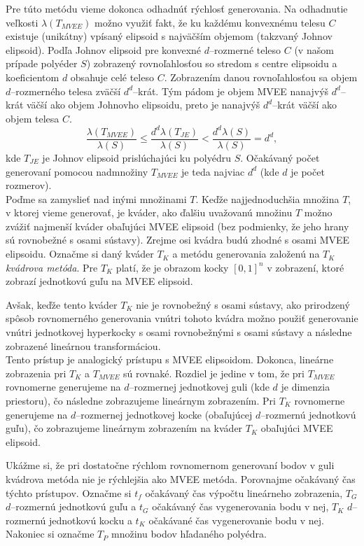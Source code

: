 Pre túto metódu vieme dokonca odhadnúť rýchlosť generovania. Na odhadnutie veľkosti $\lambda(T_{MVEE})$ možno využiť fakt, že ku každému konvexnému telesu $C$ existuje (unikátny) vpísaný elipsoid s najväčším objemom (takzvaný Johnov elipsoid). Podľa \cite{ellipsoids_ball} Johnov elipsoid pre konvexné $d$--rozmerné teleso $C$ (v našom prípade polyéder $S$) zobrazený rovnoľahlosťou so stredom s centre elipsoidu a koeficientom $d$ obsahuje celé teleso $C$. Zobrazením danou rovnoľahlosťou sa objem $d$--rozmerného telesa zväčší $d^d$--krát. Tým pádom je objem MVEE nanajvýš $d^d$--krát väčší ako objem Johnovho elipsoidu, preto je nanajvýš $d^d$--krát väčší ako objem telesa $C$.
$$\frac {\lambda(T_{MVEE})}{\lambda(S)} \leq \frac{d^d\lambda(T_{JE})}{\lambda(S)} < \frac{d^d\lambda(S)}{\lambda(S)}=d^d,$$ kde $T_{JE}$ je Johnov elipsoid prislúchajúci ku polyédru $S$. Očakávaný počet generovaní pomocou nadmnožiny $T_{MVEE}$ je teda najviac $d^d$ (kde $d$ je počet rozmerov).\\

Poďme sa zamyslieť nad inými množinami $T$. Keďže najjednoduchšia množina $T$, v ktorej vieme generovať, je kváder, ako ďalšiu uvažovanú množinu $T$ možno zvážiť najmenší kváder obaľujúci MVEE elipsoid (bez podmienky, že jeho hrany sú rovnobežné s osami sústavy). Zrejme osi kvádra budú zhodné s osami MVEE elipsoidu. Označme si daný kváder $T_K$ a metódu generovania založenú na $T_K$ \textit{kvádrova metóda}. Pre $T_K$ platí, že je obrazom kocky $[0,1]^n$ v zobrazení, ktoré zobrazí jednotkovú guľu na MVEE elipsoid.

Avšak, keďže tento kváder $T_K$ nie je rovnobežný s osami sústavy, ako prirodzený spôsob rovnomerného generovania vnútri tohoto kvádra možno použiť generovanie vnútri jednotkovej hyperkocky s osami rovnobežnými s osami sústavy a následne zobrazené lineárnou transformáciou.\\

Tento prístup je analogický prístupu s MVEE elipsoidom. Dokonca, lineárne zobrazenia pri $T_K$ a $T_{MVEE}$ sú rovnaké. Rozdiel je jedine v tom, že pri $T_{MVEE}$ rovnomerne generujeme na $d$--rozmernej jednotkovej guli (kde $d$ je dimenzia priestoru), čo následne zobrazujeme lineárnym zobrazením. Pri $T_K$ rovnomerne generujeme na $d$--rozmernej jednotkovej kocke (obaľujúcej $d$--rozmernú jednotkovú guľu), čo zobrazujeme lineárnym zobrazením na kváder $T_K$ obaľujúci MVEE elipsoid.

Ukážme si, že pri dostatočne rýchlom rovnomernom generovaní bodov v guli kvádrova metóda nie je rýchlejšia ako MVEE metóda. Porovnajme očakávaný čas týchto prístupov. Označme si $t_f$ očakávaný čas výpočtu lineárneho zobrazenia, $T_G$ $d$--rozmernú jednotkovú guľu a $t_G$ očakávaný čas vygenerovania bodu v nej, $T_K$ $d$--rozmernú jednotkovú kocku a $t_K$ očakávané čas vygenerovanie bodu v nej. Nakoniec si označme $T_P$ množinu bodov hľadaného polyédra.

